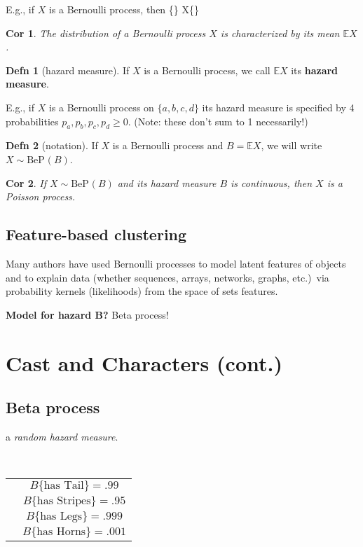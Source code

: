 \documentclass[reqno,oneside,twocolumn,10pt]{amsart}
\newtheorem*{cor}{{\color{BrickRed}Cor}}
\theoremstyle{definition}
\newtheorem*{definition}{{\color{OliveGreen}Defn}}
\theoremstyle{remark}
\def\[#1\]{\begin{align}#1\end{align}}
\newcommand{\defn}[1]{{\bf #1}}
\newcommand{\dist}{\sim}
\newcommand{\ind}{\mathrel{\perp\mkern-9mu\perp}}
\newcommand{\thelaw}{}%
\newcommand{\BePLAW}{\mathrm{BeP_{\thelaw}}}
\newcommand{\EE}{\mathbb{E}}
\begin{document}
\noindent
E.g., if $X$ is a Bernoulli process, then
\[
X\{\} \ind X\{\}
\]

\begin{cor}
The distribution of a Bernoulli process $X$ is characterized by its mean $\EE X$.
\end{cor}

\begin{definition}[hazard measure]
If $X$ is a Bernoulli process,
we call $\EE X$ its \defn{hazard measure}.
\end{definition}

E.g., if $X$ is a Bernoulli process on $\{a,b,c,d\}$ 
its hazard measure is specified by 4 probabilities
$p_a,p_b,p_c,p_d \ge 0$.  
(Note: these don't sum to 1 necessarily!)

\begin{definition}[notation]
If $X$ is a Bernoulli process and $B = \EE X$, we
will write $X \dist \BePLAW(B)$.
\end{definition}

\begin{cor}
If $X \dist \BePLAW(B)$ 
and its hazard measure $B$ is continuous, then $X$ is a Poisson process.
\end{cor}

\subsection{Feature-based clustering} 
Many authors have used Bernoulli processes to model latent features of objects and to explain data (whether sequences, arrays, networks, graphs, etc.)~via probability kernels (likelihoods) from the space of sets features.

\noindent
{\bf Model for hazard B?} Beta process!


\newpage

\section{Cast and Characters (cont.)}

\subsection{Beta process} 

a \emph{random hazard measure}.

\ \\
\begin{tabular}{cc}
&$B\{\text{has Tail}\} = .99$ \\
&$B\{\text{has Stripes}\} = .95$ \\
&$B\{\text{has Legs}\} = .999$\\
&$B\{\text{has Horns}\} = .001$
\end{tabular}
\end{document}
